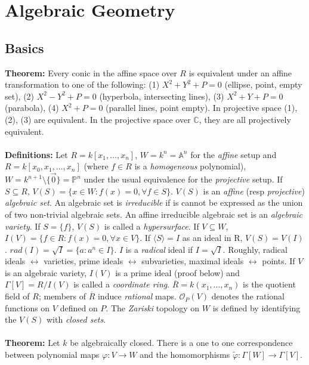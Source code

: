 \section{Algebraic Geometry}
\subsection{Basics}
{\bf Theorem:}
Every conic in the affine space over $R$ is equivalent under an affine transformation to
one of the following:
(1) $X^2 + Y^2 + P = 0$ (ellipse, point, empty set),
(2) $X^2 - Y^2 + P = 0$ (hyperbola, intersecting lines),
(3) $X^2 + Y + P = 0$ (parabola),
(4) $X^2 + P = 0$ (parallel lines, point empty).  In projective space (1), (2), (3) are
equivalent. In the projective space over ${\mathbb C}$, they are all projectively equivalent.
\\
\\
{\bf Definitions:}
Let $R=k[x_1, \ldots, x_n]$, $W= k^n= {\mathbb A}^n$ for the \emph{affine} setup and
$R=k[x_0, x_1, \ldots, x_n]$ (where $f \in R$ is a \emph{homogeneous} polynomial),
$W= k^{n+1} \setminus \{ {\vec 0}\}= {\mathbb P}^n$ under the usual equivalence 
for the \emph{projective} setup.
If $S \subseteq R$, $V(S)= \{ x \in W: f(x)=0, \forall f \in S \}$.  $V(S)$ is an
\emph{affine} (resp \emph{projective}) \emph{algebraic set}.  An algebraic set
is \emph{irreducible} if is cannot be expressed as the union of two non-trivial
algebraic sets.  An affine irreducible algebraic set is an \emph{algebraic variety}.
If $S= \{f\}$, $V(S)$ is called a \emph{hypersurface}.
If $V \subseteq W$, $I(V)= \{ f \in R: f(x)=0, \forall x \in V \}$.
If $\langle S \rangle= I$ as an ideal in R, $V(S)=V(I)$.
$rad(I)={\sqrt I}= \{a: a^n \in I\}$.  $I$ is a \emph{radical} ideal if $I={\sqrt I}$.
Roughly, radical ideals $\leftrightarrow$ varieties,
prime ideals $\leftrightarrow$ subvarieties,
maximal ideals $\leftrightarrow$ points.  
If $V$ is an algebraic variety, $I(V)$ is a prime ideal (proof below)
and $\Gamma[V]= R/I(V)$ is
called a \emph{coordinate ring}.
${\overline R}= k(x_1, \ldots, x_n)$ is the quotient field of $R$; members of ${\overline R}$
induce \emph{rational} maps.
${\mathcal O}_P(V)$ denotes the rational functions on $V$ defined on $P$.
The \emph{Zariski} topology on $W$ is defined by identifying the $V(S)$ with
\emph{closed sets}.
\\
\\
{\bf Theorem:}
Let $k$ be algebraically closed. 
There is a one to one correspondence between polynomial maps $\varphi: V \rightarrow W$
and the homomorphisms ${\tilde {\varphi}}: \Gamma[W] \rightarrow \Gamma[V]$.
